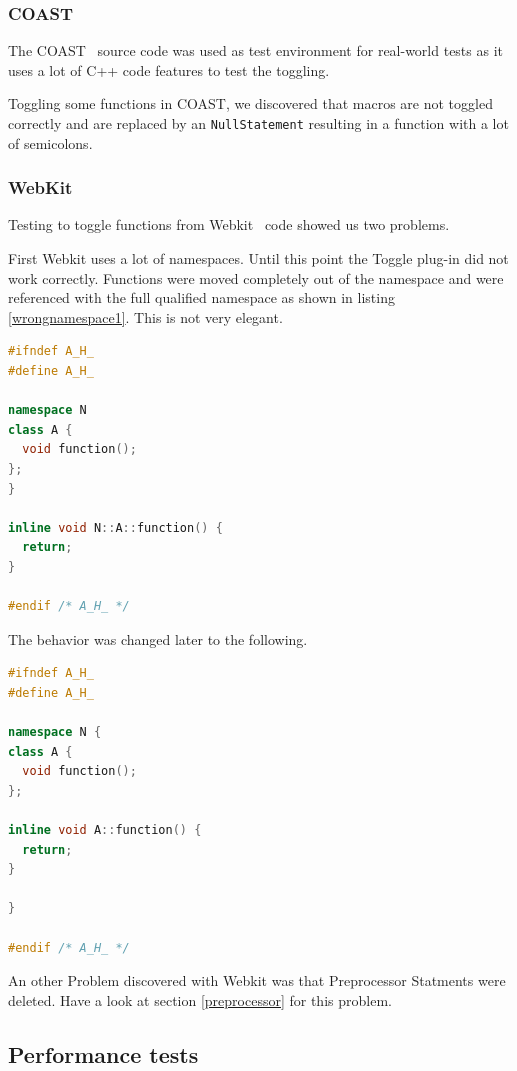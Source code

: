 \subsubsection{COAST}
The COAST~\cite{COAST} source code was used as test environment for real-world 
tests as it uses a lot of C++ code features to test the toggling.

Toggling some functions in COAST, we discovered that macros are not toggled
correctly and are replaced by an \texttt{NullStatement} resulting in a function
with a lot of semicolons.

\subsubsection{WebKit}
Testing to toggle functions from Webkit~\cite{Webkit} code showed us two
problems.

First Webkit uses a lot of namespaces. Until this point the Toggle
plug-in did not work correctly. Functions were moved completely out of the
namespace and were referenced with the full qualified namespace as shown in
listing \ref{wrongnamespace1}. This is not very elegant.

\begin{lstlisting}[caption={\texttt{function()} with reference to fully
qualified namespace}, label={wrongnamespace1}, language=C++]
#ifndef A_H_
#define A_H_

namespace N
class A {
  void function();
};
}

inline void N::A::function() {
  return;
}

#endif /* A_H_ */
\end{lstlisting}

The behavior was changed later to the following.

\begin{lstlisting}[caption={A.h, function definition in namespace},
label={wrongnamespace2}, language=C++]
#ifndef A_H_
#define A_H_

namespace N {
class A {
  void function();
};

inline void A::function() {
  return;
}

}

#endif /* A_H_ */
\end{lstlisting}

An other Problem discovered with Webkit was that Preprocessor Statments were
deleted. Have a look at section \ref{preprocessor} for this problem.

\subsection{Performance tests}

